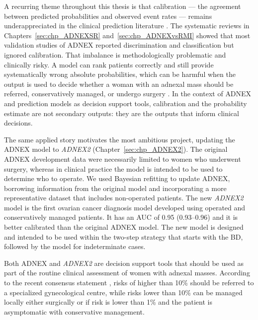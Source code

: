 A recurring theme throughout this thesis is that calibration --- the agreement between predicted probabilities and observed event rates --- remains underappreciated in the clinical prediction literature \cite{vancalsterCalibrationAchillesHeel2019}. The systematic reviews in Chapters~\ref{sec:chp_ADNEXSR} and~\ref{sec:chp_ADNEXvsRMI} showed that most validation studies of \gls{ADNEX} reported discrimination and classification but ignored calibration. That imbalance is methodologically problematic and clinically risky. A model can rank patients correctly and still provide systematically wrong absolute probabilities, which can be harmful when the output is used to decide whether a woman with an adnexal mass should be referred, conservatively managed, or undergo surgery \cite{vancalsterCalibrationRiskPrediction2015}. In the context of \gls{ADNEX} and prediction models as decision support tools, calibration and the probability estimate are not secondary outputs: they are the outputs that inform clinical decisions.

The same applied story motivates the most ambitious project, updating the ADNEX model to \emph{ADNEX2} (Chapter~\ref{sec:chp_ADNEX2}). The original \gls{ADNEX} development data were necessarily limited to women who underwent surgery, whereas in clinical practice the model is intended to be used to determine who to operate. We used Bayesian refitting to update \gls{ADNEX}, borrowing information from the original model and incorporating a more representative dataset that includes non-operated patients. The new \emph{ADNEX2} model is the first ovarian cancer diagnosis model developed using operated and conservatively managed patients. It has an AUC of 0.95 (0.93--0.96)  and it is better calibrated than the original ADNEX model. The new model is designed and intended to be used within the two-step strategy that starts with the \gls{BD}, followed by the model for indeterminate cases. 

Both \gls{ADNEX} and \emph{ADNEX2} are decision support tools that should be used as part of the routine clinical assessment of women with adnexal masses. According to the recent consensus statement \cite{timmermanESGOISUOGIOTA2021}, risks of higher than 10\% should be referred to a specialized gynecological centre, while risks lower than 10\% can be managed locally either surgically or if risk is lower than 1\% and the patient is asymptomatic with conservative management. 

